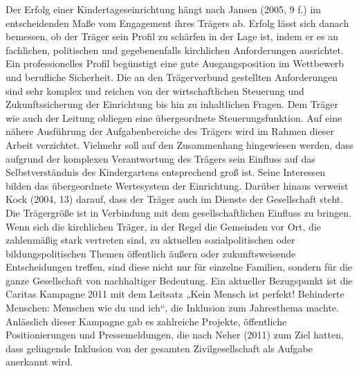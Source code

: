 Der Erfolg einer Kindertageseinrichtung hängt nach Jansen (2005, 9 f.) im entscheidenden Maße vom Engagement ihres Trägers ab. Erfolg lässt sich danach bemessen, ob der Träger sein Profil zu schärfen in der Lage ist, indem er es an fachlichen, politischen und gegebenenfalls kirchlichen Anforderungen ausrichtet. Ein professionelles Profil begünstigt eine gute Ausgangsposition im Wettbewerb und berufliche Sicherheit. Die an den Trägerverbund gestellten Anforderungen sind sehr komplex und reichen von der wirtschaftlichen Steuerung und Zukunftssicherung der Einrichtung bis hin zu inhaltlichen Fragen. Dem Träger wie auch der Leitung obliegen eine übergeordnete Steuerungsfunktion. Auf eine nähere Ausführung der Aufgabenbereiche des Trägers wird im Rahmen dieser Arbeit verzichtet. Vielmehr soll auf den Zusammenhang hingewiesen werden, dass aufgrund der komplexen Verantwortung des Trägers sein Einfluss auf das Selbstverständnis des Kindergartens entsprechend groß ist. Seine Interessen bilden das übergeordnete Wertesystem der Einrichtung. Darüber hinaus verweist Kock (2004, 13) darauf, dass der Träger auch im Dienste der Gesellschaft steht. Die Trägergröße ist in Verbindung mit dem gesellschaftlichen Einfluss zu bringen. 
Wenn sich die kirchlichen Träger, in der Regel die Gemeinden vor Ort,  die zahlenmäßig stark vertreten sind, zu aktuellen sozialpolitischen oder bildungspolitischen Themen öffentlich äußern oder zukunftsweisende Entscheidungen treffen, sind diese nicht nur für einzelne Familien, sondern für die ganze Gesellschaft von nachhaltiger Bedeutung. Ein aktueller Bezugspunkt ist die Caritas Kampagne 2011 mit dem Leitsatz „Kein Mensch ist perfekt! Behinderte Menschen: Menschen wie du und ich“, die Inklusion zum Jahresthema machte. Anlässlich dieser Kampagne gab es zahlreiche Projekte, öffentliche Positionierungen und Pressemeldungen, die nach Neher (2011) zum Ziel hatten, dass gelingende Inklusion von der gesamten Zivilgesellschaft als Aufgabe anerkannt wird.
   
